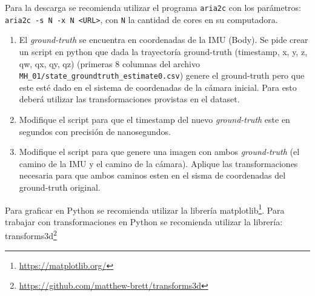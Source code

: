 \documentclass[tp]{lcc}
\begin{document}
\nota Para la descarga se recomienda utilizar el programa \lstinline{aria2c} con los parámetros: \lstinline{aria2c -s N -x N <URL>}, con \lstinline{N} la cantidad de cores en su computadora.

\begin{enumerate}
    \item El \emph{ground-truth} se encuentra en coordenadas de la IMU (Body). Se pide crear un script en python que dada la trayectoría ground-truth (timestamp, x, y, z, qw, qx, qy, qz) (primeras 8 columnas del archivo \lstinline{MH_01/state_groundtruth_estimate0.csv}) genere el ground-truth pero que este esté dado en el sistema de coordenadas de la cámara inicial. Para esto deberá utilizar las transformaciones provistas en el dataset. 
    
    \item Modifique el script para que el timestamp del nuevo \emph{ground-truth} este en segundos con precisión de nanosegundos.
    
    \item Modifique el script para que genere una imagen con ambos \emph{ground-truth} (el camino de la IMU y el camino de la cámara). Aplique las transformaciones necesaria para que ambos caminos esten en el sisma de coordenadas del ground-truth original.
\end{enumerate}
\nota Para graficar en Python se recomienda utilizar la librería matplotlib\footnote{\url{https://matplotlib.org/}}. Para trabajar con transformaciones en Python se recomienda utilizar la librería: transforms3d\footnote{\url{https://github.com/matthew-brett/transforms3d}}
\end{document}
